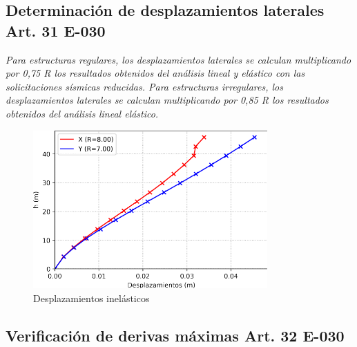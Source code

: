 \documentclass{article}%
\begin{document}
%
\subsection{Determinación de desplazamientos laterales Art. 31 E{-}030}%
\label{subsec:DeterminacindedesplazamientoslateralesArt.31E{-}030}%
\begin{tcolorbox}[colback=gray!5!white,colframe=Maroon!75!black,fonttitle=\bfseries,title=Art. 31.3.1]%
\textit{Para  estructuras  regulares, los  desplazamientos  laterales  se  calculan multiplicando por 0,75 R los resultados obtenidos del análisis lineal y elástico con las solicitaciones sísmicas reducidas. Para estructuras irregulares, los desplazamientos laterales se calculan multiplicando por 0,85 R los resultados obtenidos del análisis lineal elástico.}%
\end{tcolorbox}%


\begin{figure}[H]%
\includegraphics[width=0.8\textwidth]{images/desplazamientos_laterales}%
\caption{Desplazamientos inelásticos}%
\end{figure}

%
\subsection{Verificación de derivas máximas Art. 32 E{-}030}%
\label{subsec:VerificacindederivasmximasArt.32E{-}030}%
\end{document}
